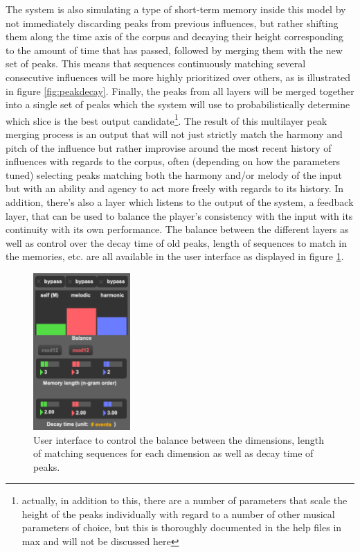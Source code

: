 The system is also simulating a type of short-term memory inside this model by not immediately discarding peaks from previous influences, but rather shifting them along the time axis of the corpus and decaying their height corresponding to the amount of time that has passed, followed by merging them with the new set of peaks. This means that sequences continuously matching several consecutive influences will be more highly prioritized over others, as is illustrated in figure \ref{fig:peakdecay}. Finally, the peaks from all layers will be merged together into a single set of peaks which the system will use to probabilistically determine which slice is the best output candidate\footnote{actually, in addition to this, there are a number of parameters that scale the height of the peaks individually with regard to a number of other musical parameters of choice, but this is thoroughly documented in the help files in max and will not be discussed here}. The result of this multilayer peak merging process is an output that will not just strictly match the harmony and pitch of the influence but rather improvise around the most recent history of influences with regards to the corpus, often (depending on how the parameters tuned) selecting peaks matching both the harmony and/or melody of the input but with an ability and agency to act more freely with regards to its history. In addition, there's also a layer which listens to the output of the system, a feedback layer, that can be used to balance the player's consistency with the input with its continuity with its own performance. The balance between the different layers as well as control over the decay time of old peaks, length of sequences to match in the memories, etc. are all available in the user interface as displayed in figure \ref{fig:atomui}. 

 \begin{figure}[h]
    \centering        
 	\includegraphics[width=0.33\textwidth]{img/atoms_ui.png}
    \caption{User interface to control the balance between the dimensions, length of matching sequences for each dimension as well as decay time of peaks.}
    \label{fig:atomui}
\end{figure}

